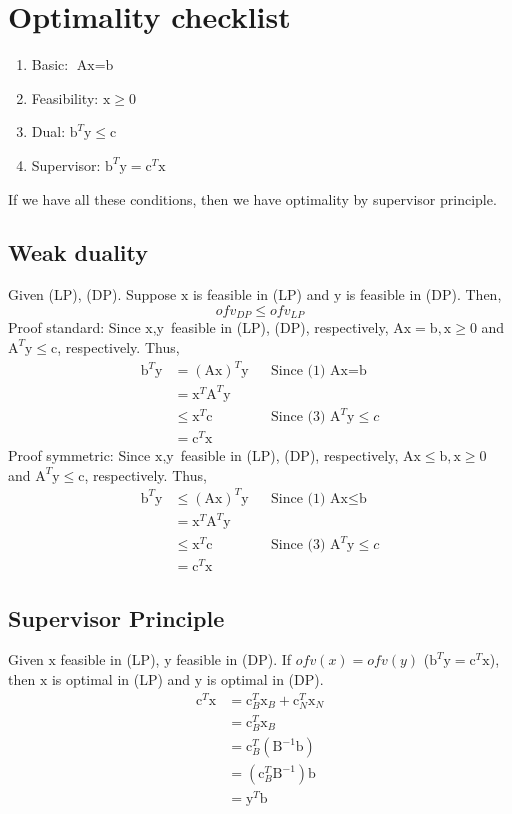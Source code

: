 \documentclass[6pt]{article}
\def\x{\textrm{x}}
\def\y{\textrm{y}}
\def\c{\textrm{c}}
\def\b{\textrm{b}}
\def\A{\textrm{A}}
\def\B{\textrm{B}}
\begin{document}
\section{Optimality checklist}
\begin{enumerate}
    \item Basic: $\A\x=\b$
    \item Feasibility: $\x\geq 0$
    \item Dual: $\b^T\y \leq \c$
    \item Supervisor: $\b^T\y = \c^T\x$
\end{enumerate}
If we have all these conditions, then we have optimality by supervisor principle.

\subsection{Weak duality}
Given (LP), (DP). Suppose $\x$ is feasible in (LP) and $\y$ is feasible in (DP). Then, $$ofv_{DP}\leq ofv_{LP}$$
Proof standard:
Since $\x,\y$ feasible in (LP), (DP), respectively, $\A\x=\b, \x\geq 0$ and $\A^T\y\leq \c$, respectively. Thus,
\begin{align*}
    \b^T\y &= (\A\x)^T\y && \text{Since (1) } \A\x=\b\\
    &= \x^T\A^T\y\\
    &\leq \x^T\c && \text{Since (3) }\A^T\y\leq c\\
    &= \c^T\x
\end{align*}
Proof symmetric:
Since $\x,\y$ feasible in (LP), (DP), respectively, $\A\x\leq\b, \x\geq 0$ and $\A^T\y\leq \c$, respectively. Thus,
\begin{align*}
    \b^T\y &\leq (\A\x)^T\y && \text{Since (1) } \A\x\leq\b\\
    &= \x^T\A^T\y\\
    &\leq \x^T\c && \text{Since (3) }\A^T\y\leq c\\
    &= \c^T\x
\end{align*}

\subsection{Supervisor Principle}
Given $\x$ feasible in (LP), $\y$ feasible in (DP). If $ofv(x)=ofv(y)$ ($\b^T\y=\c^T\x$), then $\x$ is optimal in (LP) and $\y$ is optimal in (DP).
\begin{align*}
    \c^T\x &= \c_B^T\x_B + \c_N^T\x_N\\
    &= \c_B^T\x_B\\
    &= \c_B^T(\B^{-1}\b)\\
    &= (\c_B^T\B^{-1})\b\\
    &= \y^T\b
\end{align*}
\end{document}
